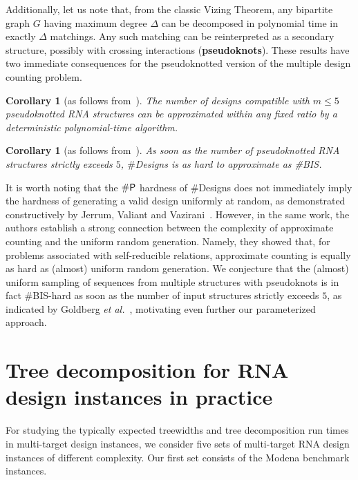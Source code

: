 \documentclass{bioinfo}
\newtheorem{corollary}[theorem]{Corollary}
\newcommand{\Def}[1]{{\bf #1}}
\newcommand{\NumDesign}{\ensuremath{\#}{\sf Designs}\xspace}
\begin{document}
Additionally, let us note that, from the classic Vizing Theorem, any bipartite graph $G$ having maximum degree $\Delta$ can be decomposed in polynomial time in exactly $\Delta$ matchings. Any such matching can be reinterpreted as a secondary structure, possibly with crossing interactions (\Def{pseudoknots}). These results have two immediate consequences for the pseudoknotted version of the multiple design counting problem.
\begin{corollary}[as follows from~\cite{Weitz2006}]The number of designs compatible with $m\le 5$ pseudoknotted RNA structures can be approximated within any fixed ratio by a deterministic polynomial-time algorithm.
\end{corollary}
\begin{corollary}[as follows from~\cite{Cai2016}]
  As soon as the number of pseudoknotted RNA structures strictly exceeds $5$, \NumDesign is as hard to approximate as {\#{\sf BIS}}.
\end{corollary}

It is worth noting that the $\#{\sf P}$ hardness of \NumDesign does not immediately imply the hardness of generating a valid design uniformly at random, as demonstrated constructively by Jerrum, Valiant and Vazirani~\cite{Jerrum1986}. However, in the same work, the authors establish a strong connection between the complexity of approximate counting and the uniform random generation. Namely, they showed that, for problems associated with self-reducible relations, approximate counting is equally as hard as (almost) uniform random generation. We conjecture that the (almost) uniform sampling of sequences from multiple structures with pseudoknots is in fact \#{\sf BIS}-hard as soon as the number of input structures strictly exceeds $5$, as indicated by Goldberg \emph{et al.}~\cite{Goldberg2004}, motivating even further our parameterized approach.

\section{Tree decomposition for RNA design instances in practice}
\label{appsec:treedecomp}

For studying the typically expected treewidths and tree decomposition
run times in multi-target design instances, we consider five sets of
multi-target RNA design instances of different complexity. Our first
set consists of the Modena benchmark instances.
\end{document}
